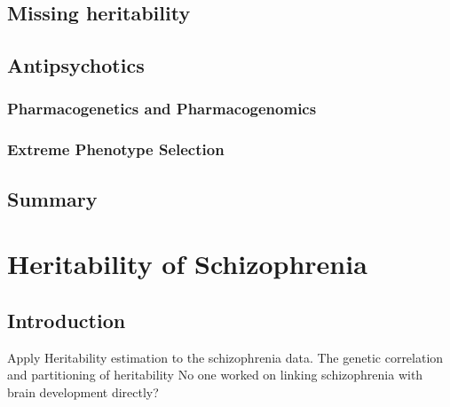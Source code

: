 \documentclass{book}
\begin{document}
	\section{Missing heritability}
	
	
	
	

	\section{Antipsychotics}
	\subsection{Pharmacogenetics and Pharmacogenomics}
	\subsection{Extreme Phenotype Selection}
	\section{Summary}
	
	
	
	\chapter{Heritability of Schizophrenia}
	\section{Introduction}
	Apply Heritability estimation to the schizophrenia data.
	The genetic correlation and partitioning of heritability
	No one worked on linking schizophrenia with brain development directly?
\end{document}
